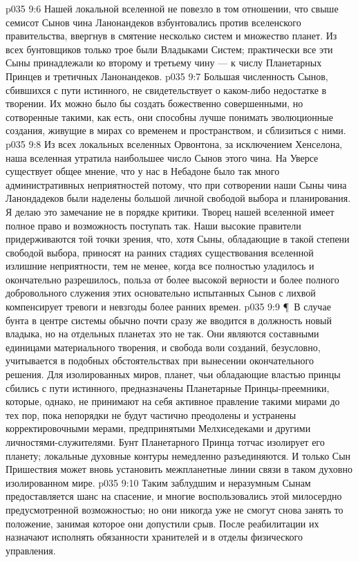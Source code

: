 \vs p035 9:6 Нашей локальной вселенной не повезло в том отношении, что свыше семисот Сынов чина Ланонандеков взбунтовались против вселенского правительства, ввергнув в смятение несколько систем и множество планет. Из всех бунтовщиков только трое были Владыками Систем; практически все эти Сыны принадлежали ко второму и третьему чину --- к числу Планетарных Принцев и третичных Ланонандеков.
\vs p035 9:7 Большая численность Сынов, сбившихся с пути истинного, не свидетельствует о каком\hyp{}либо недостатке в творении. Их можно было бы создать божественно совершенными, но сотворенные такими, как есть, они способны лучше понимать эволюционные создания, живущие в мирах со временем и пространством, и сблизиться с ними.
\vs p035 9:8 Из всех локальных вселенных Орвонтона, за исключением Хенселона, наша вселенная утратила наибольшее число Сынов этого чина. На Уверсе существует общее мнение, что у нас в Небадоне было так много административных неприятностей потому, что при сотворении наши Сыны чина Ланондадеков были наделены большой личной свободой выбора и планирования. Я делаю это замечание не в порядке критики. Творец нашей вселенной имеет полное право и возможность поступать так. Наши высокие правители придерживаются той точки зрения, что, хотя Сыны, обладающие в такой степени свободой выбора, приносят на ранних стадиях существования вселенной излишние неприятности, тем не менее, когда все полностью уладилось и окончательно разрешилось, польза от более высокой верности и более полного добровольного служения этих основательно испытанных Сынов с лихвой компенсирует тревоги и невзгоды более ранних времен.
\vs p035 9:9 \P\ В случае бунта в центре системы обычно почти сразу же вводится в должность новый владыка, но на отдельных планетах это не так. Они являются составными единицами материального творения, и свобода воли созданий, безусловно, учитывается в подобных обстоятельствах при вынесении окончательного решения. Для изолированных миров, планет, чьи обладающие властью принцы сбились с пути истинного, предназначены Планетарные Принцы\hyp{}преемники, которые, однако, не принимают на себя активное правление такими мирами до тех пор, пока непорядки не будут частично преодолены и устранены корректировочными мерами, предпринятыми Мелхиседеками и другими личностями\hyp{}служителями. Бунт Планетарного Принца тотчас изолирует его планету; локальные духовные контуры немедленно разъединяются. И только Сын Пришествия может вновь установить межпланетные линии связи в таком духовно изолированном мире.
\vs p035 9:10 Таким заблудшим и неразумным Сынам предоставляется шанс на спасение, и многие воспользовались этой милосердно предусмотренной возможностью; но они никогда уже не смогут снова занять то положение, занимая которое они допустили срыв. После реабилитации их назначают исполнять обязанности хранителей и в отделы физического управления.
